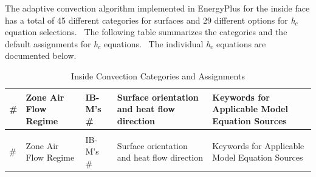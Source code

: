 The adaptive convection algorithm implemented in EnergyPlus for the inside face has a total of 45 different categories for surfaces and 29 different options for \emph{h\(_{c}\)} equation selections.~ The following table summarizes the categories and the default assignments for \emph{h\(_{c}\)} equations.~ The individual \emph{h\(_{c}\)} equations are documented below.

{\scriptsize
\begin{longtable}[c]{p{0.25in}p{1.25in}p{0.25in}p{1.5in}p{2.5in}}

\caption{Inside Convection Categories and Assignments \label{table:table-13.-inside-convection-categories}} \tabularnewline
\toprule
\# & Zone Air Flow Regime & IB-M's \# & Surface orientation and heat flow direction & Keywords for Applicable Model Equation Sources \tabularnewline
\midrule
\endfirsthead

\caption[]{Inside Convection Categories and Assignments} \tabularnewline
\toprule
\# & Zone Air Flow Regime & IB-M's \# & Surface orientation and heat flow direction & Keywords for Applicable Model Equation Sources \tabularnewline
\midrule
\endhead


\end{longtable}}
